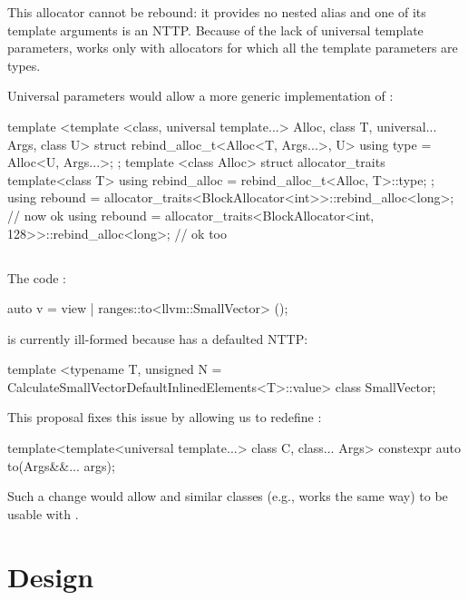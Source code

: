 \documentclass{wg21}
\begin{document}
This allocator cannot be rebound: it provides no  nested alias and one of its template arguments is an NTTP.
Because of the lack of universal template parameters,  works only with allocators for which all the template parameters are types.

Universal parameters would allow a more generic implementation of :


\begin{colorblock}
template <template <class, universal template...> Alloc, class T, universal... Args, class U>
struct rebind_alloc_t<Alloc<T, Args...>, U> {
    using type = Alloc<U, Args...>;
};
template <class Alloc>
struct allocator_traits {
    template<class T>
    using rebind_alloc = rebind_alloc_t<Alloc, T>::type;
};
using rebound = allocator_traits<BlockAllocator<int>>::rebind_alloc<long>; // now ok
using rebound = allocator_traits<BlockAllocator<int, 128>>::rebind_alloc<long>; // ok too
\end{colorblock}

\subsection{}

The code :

\begin{colorblock}
auto v = view | ranges::to<llvm::SmallVector> ();
\end{colorblock}

is currently ill-formed because  has a defaulted NTTP:

\begin{colorblock}
template <typename T, unsigned N = CalculateSmallVectorDefaultInlinedElements<T>::value>
class SmallVector;
\end{colorblock}

This proposal fixes this issue by allowing us to redefine :

\begin{colorblock}
template<template<universal template...> class C, class... Args>
constexpr auto to(Args&&... args);
\end{colorblock}

Such a change would allow  and similar classes (e.g.,  works the same way) to be usable with .

\section{Design}
\end{document}
